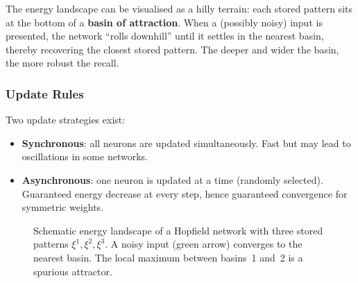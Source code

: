 \begin{insightbox}
The energy landscape can be visualised as a hilly terrain: each stored pattern sits at the bottom of a \textbf{basin of attraction}.
When a (possibly noisy) input is presented, the network ``rolls downhill'' until it settles in the nearest basin, thereby recovering the closest stored pattern.
The deeper and wider the basin, the more robust the recall.
\end{insightbox}

\subsubsection*{Update Rules}

Two update strategies exist:
\begin{itemize}
    \item \textbf{Synchronous}: all neurons are updated simultaneously. Fast but may lead to oscillations in some networks.
    \item \textbf{Asynchronous}: one neuron is updated at a time (randomly selected). Guaranteed energy decrease at every step, hence guaranteed convergence for symmetric weights.
\end{itemize}

\begin{figure}[h]
\centering
{}
\caption{Schematic energy landscape of a Hopfield network with three stored patterns $\xi^1,\xi^2,\xi^3$.  A noisy input (green arrow) converges to the nearest basin.  The local maximum between basins~1 and~2 is a spurious attractor.}
\label{fig:energy-landscape}
\end{figure}

